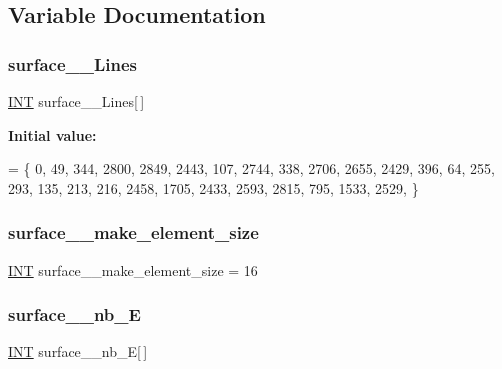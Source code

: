 \subsection{Variable Documentation}
\mbox{\label{surface__7_8_c_a4c48e6df8da715f4482efed463f89df8}} 
\subsubsection{\texorpdfstring{surface\+\_\+\_\+\+Lines}{surface\_7\_Lines}}
{\footnotesize\ttfamily \mbox{\hyperlink{galois_8h_a09fddde158a3a20bd2dcadb609de11dc}{I\+NT}} surface\+\_\+\_\+\+Lines\mbox{[}$\,$\mbox{]}}

{\bfseries Initial value\+:}
\begin{DoxyCode}
= \{ 
    0, 49, 344, 2800, 2849, 2443, 107, 2744, 338, 2706, 2655, 2429, 396, 64, 255, 293, 135, 213, 216, 2458,
       1705, 2433, 2593, 2815, 795, 1533, 2529, 
\}
\end{DoxyCode}
\mbox{\label{surface__7_8_c_a58d40b98e55ce29c0efe58f4f105e58b}} 
\subsubsection{\texorpdfstring{surface\+\_\+\_\+make\+\_\+element\+\_\+size}{surface\_7\_make\_element\_size}}
{\footnotesize\ttfamily \mbox{\hyperlink{galois_8h_a09fddde158a3a20bd2dcadb609de11dc}{I\+NT}} surface\+\_\+\_\+make\+\_\+element\+\_\+size = 16}

\mbox{\label{surface__7_8_c_a08bb0d5d50000c29330543cc180468c8}} 
\subsubsection{\texorpdfstring{surface\+\_\+\_\+nb\+\_\+E}{surface\_7\_nb\_E}}
{\footnotesize\ttfamily \mbox{\hyperlink{galois_8h_a09fddde158a3a20bd2dcadb609de11dc}{I\+NT}} surface\+\_\+\_\+nb\+\_\+E\mbox{[}$\,$\mbox{]}}

